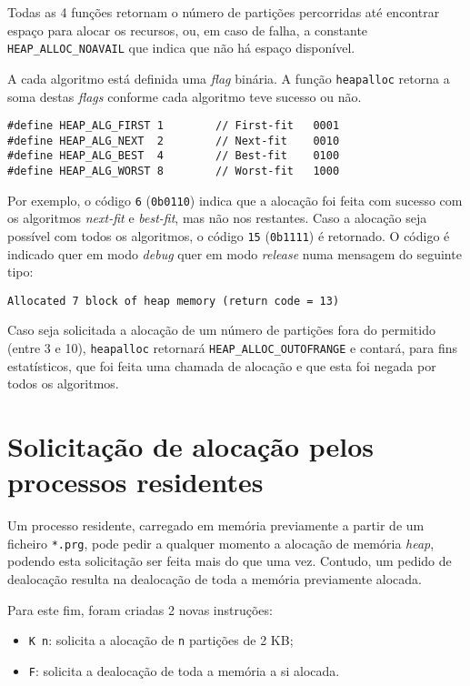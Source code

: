 \documentclass[10pt,oneside]{estiloUBI}
\begin{document}
	Todas as 4 funções retornam o número de partições percorridas até encontrar espaço para alocar os recursos, ou, em caso de falha, a constante \verb|HEAP_ALLOC_NOAVAIL| que indica que não há espaço disponível.
	
	A cada algoritmo está definida uma \textit{flag} binária. A função \verb|heapalloc| retorna a soma destas \textit{flags} conforme cada algoritmo teve sucesso ou não.
	
	\begin{verbatim}
#define HEAP_ALG_FIRST 1        // First-fit   0001
#define HEAP_ALG_NEXT  2        // Next-fit    0010
#define HEAP_ALG_BEST  4        // Best-fit    0100
#define HEAP_ALG_WORST 8        // Worst-fit   1000
	\end{verbatim}
	
	Por exemplo, o código \verb|6| (\verb|0b0110|) indica que a alocação foi feita com sucesso com os algoritmos \textit{next-fit} e \textit{best-fit}, mas não nos restantes. Caso a alocação seja possível com todos os algoritmos, o código \verb|15| (\verb|0b1111|) é retornado. O código é indicado quer em modo \textit{debug} quer em modo \textit{release} numa mensagem do seguinte tipo:
	
	\begin{verbatim}
Allocated 7 block of heap memory (return code = 13)
	\end{verbatim}
	
	Caso seja solicitada a alocação de um número de partições fora do permitido (entre 3 e 10), \verb|heapalloc| retornará \verb|HEAP_ALLOC_OUTOFRANGE| e contará, para fins estatísticos, que foi feita uma chamada de alocação e que esta foi negada por todos os algoritmos.
	
	
	
	\section{Solicitação de alocação pelos processos residentes}
	\label{ssec:heap:alloc}
	
	Um processo residente, carregado em memória previamente a partir de um ficheiro \verb|*.prg|, pode pedir a qualquer momento a alocação de memória \textit{heap}, podendo esta solicitação ser feita mais do que uma vez. Contudo, um pedido de dealocação resulta na dealocação de toda a memória previamente alocada.
	
	Para este fim, foram criadas 2 novas instruções:
	
	\begin{itemize}
		\item \verb|K n|: solicita a alocação de \verb|n| partições de 2 KB;
		\item \verb|F|: solicita a dealocação de toda a memória a si alocada.
	\end{itemize}
\end{document}

